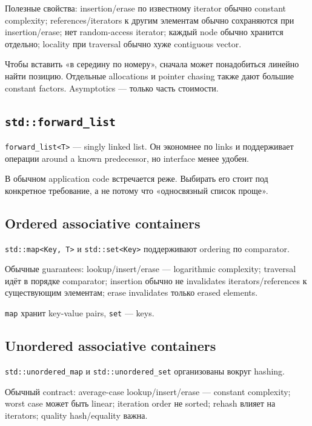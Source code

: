 Полезные свойства:
insertion/erase по известному iterator обычно constant complexity; references/iterators к другим элементам обычно сохраняются при insertion/erase; нет random-access iterator; каждый node обычно хранится отдельно; locality при traversal обычно хуже contiguous vector.

\begin{performancebox}
Чтобы вставить «в середину по номеру», сначала может понадобиться линейно найти
позицию. Отдельные allocations и pointer chasing также дают большие constant
factors. Asymptotics --- только часть стоимости.
\end{performancebox}

\subsection{\texttt{std::forward\_list}}

\texttt{forward\_list<T>} --- singly linked list. Он экономнее по links и
поддерживает операции around a known predecessor, но interface менее удобен.

В обычном application code встречается реже. Выбирать его стоит под конкретное
требование, а не потому что «односвязный список проще».

\subsection{Ordered associative containers}

\texttt{std::map<Key, T>} и \texttt{std::set<Key>} поддерживают ordering по
comparator.

Обычные guarantees:
lookup/insert/erase --- logarithmic complexity; traversal идёт в порядке comparator; insertion обычно не invalidates iterators/references к существующим элементам; erase invalidates только erased elements.

\texttt{map} хранит key-value pairs, \texttt{set} --- keys.

\subsection{Unordered associative containers}

\texttt{std::unordered\_map} и \texttt{std::unordered\_set} организованы вокруг
hashing.

Обычный contract:
average-case lookup/insert/erase --- constant complexity; worst case может быть linear; iteration order не sorted; rehash влияет на iterators; quality hash/equality важна.

